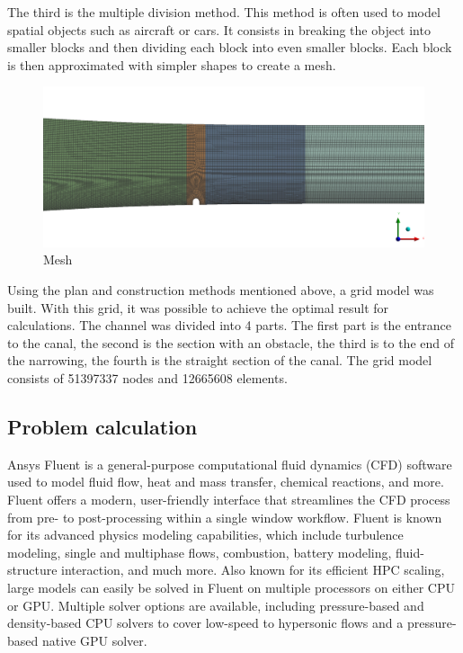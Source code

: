 	The third is the multiple division method. This method is often used to model spatial objects such as aircraft or cars. It consists in breaking the object into smaller blocks and then dividing each block into even smaller blocks. Each block is then approximated with simpler shapes to create a mesh.
	
	\begin{figure}[H]
		\centering
		\includegraphics[width=1\linewidth]{../Assets/Mesh1}
		\caption{\footnotesize{Mesh}}
		\label{fig:mesh1}
	\end{figure}
	Using the plan and construction methods mentioned above, a grid model was built. With this grid, it was possible to achieve the optimal result for calculations. The channel was divided into 4 parts. The first part is the entrance to the canal, the second is the section with an obstacle, the third is to the end of the narrowing, the fourth is the straight section of the canal. The grid model consists of 51397337 nodes and 12665608 elements.
	
\subsection{Problem calculation}
	Ansys Fluent is a general-purpose computational fluid dynamics (CFD) software used to model fluid flow, heat and mass transfer, chemical reactions, and more. Fluent offers a modern, user-friendly interface that streamlines the CFD process from pre- to post-processing within a single window workflow. Fluent is known for its advanced physics modeling capabilities, which include turbulence modeling, single and multiphase flows, combustion, battery modeling, fluid-structure interaction, and much more. Also known for its efficient HPC scaling, large models can easily be solved in Fluent on multiple processors on either CPU or GPU. Multiple solver options are available, including pressure-based and density-based CPU solvers to cover low-speed to hypersonic flows and a pressure-based native GPU solver.
	
